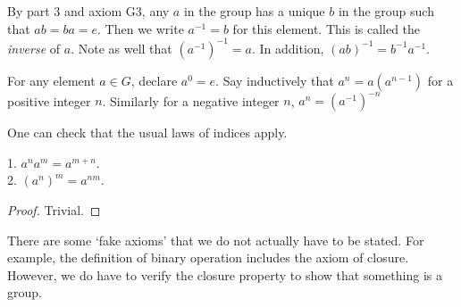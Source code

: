 By part 3 and axiom G3, any $a$ in the group has a unique $b$ in the group such that $ab=ba=e$.
Then we write $a^{-1}=b$ for this element.
This is called the \textit{inverse} of $a$.
Note as well that $(a^{-1})^{-1}=a$.
In addition, $(ab)^{-1}=b^{-1}a^{-1}$.
\begin{definition}
    For any element $a\in G$, declare $a^0=e$.
    Say inductively that $a^n=a(a^{n-1})$ for a positive integer $n$.
    Similarly for a negative integer $n$, $a^n=(a^{-1})^{-n}$
\end{definition}
One can check that the usual laws of indices apply.
\begin{proposition}
    1. $a^na^m=a^{m+n}$.\\
    2. $(a^n)^m=a^{nm}$.
\end{proposition}
\begin{proof}
    Trivial.
\end{proof}
There are some `fake axioms' that we do not actually have to be stated.
For example, the definition of binary operation includes the axiom of closure.
However, we do have to verify the closure property to show that something is a group.